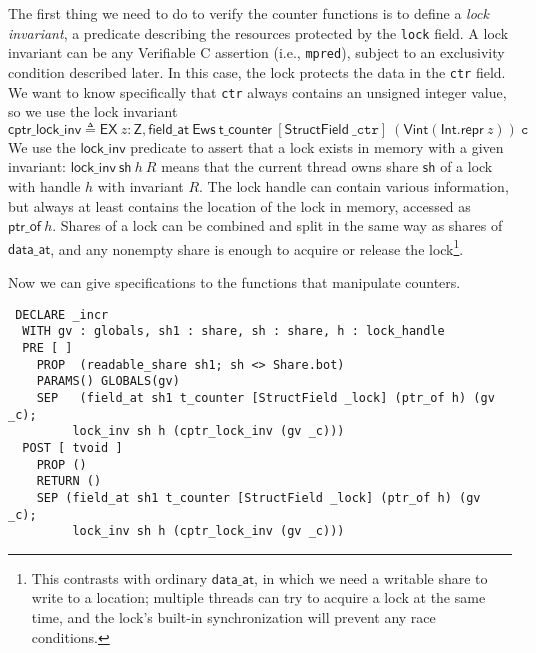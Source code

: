 \documentclass[11pt]{article}
\begin{document}
The first thing we need to do to verify the counter functions is to define a \emph{lock invariant}, a predicate describing the resources protected by the \texttt{lock} field. A lock invariant can be any Verifiable C assertion (i.e., \texttt{mpred}), subject to an exclusivity condition described later. In this case, the lock protects the data in the \texttt{ctr} field. We want to know specifically that \texttt{ctr} always contains an unsigned integer value, so we use the lock invariant \[\mathsf{cptr\_lock\_inv} \triangleq \mathsf{EX}\ z : \mathsf{Z}, \mathsf{field\_at}\ \mathsf{Ews}\ \mathsf{t\_counter}\ [\mathsf{StructField}\ \texttt{\_ctr}]\ (\mathsf{Vint} (\mathsf{Int.repr}\ z))\ \texttt{c}\] We use the $\mathsf{lock\_inv}$ predicate to assert that a lock exists in memory with a given invariant: $\mathsf{lock\_inv}\ \mathsf{sh}\ h\ R$ means that the current thread owns share $\mathsf{sh}$ of a lock with handle $h$ with invariant $R$. The lock handle can contain various information, but always at least contains the location of the lock in memory, accessed as $\mathsf{ptr\_of}\ h$. Shares of a lock can be combined and split in the same way as shares of $\mathsf{data\_at}$, and any nonempty share is enough to acquire or release the lock\footnote{This contrasts with ordinary $\mathsf{data\_at}$, in which we need a writable share to write to a location; multiple threads can try to acquire a lock at the same time, and the lock's built-in synchronization will prevent any race conditions.}.

Now we can give specifications to the functions that manipulate counters.
\begin{verbatim}
 DECLARE _incr
  WITH gv : globals, sh1 : share, sh : share, h : lock_handle
  PRE [ ]
    PROP  (readable_share sh1; sh <> Share.bot)
    PARAMS() GLOBALS(gv)
    SEP   (field_at sh1 t_counter [StructField _lock] (ptr_of h) (gv _c);
         lock_inv sh h (cptr_lock_inv (gv _c)))
  POST [ tvoid ]
    PROP ()
    RETURN ()
    SEP (field_at sh1 t_counter [StructField _lock] (ptr_of h) (gv _c);
         lock_inv sh h (cptr_lock_inv (gv _c)))
\end{verbatim}
\end{document}

